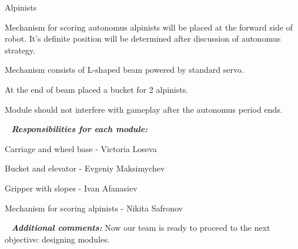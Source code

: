 \begin{enumerate*}
  	\item Alpinists
  	\begin{enumerate*}
  		\item Mechanism for scoring autonomus alpinists will be placed at the forward side of robot. It's definite position will be determined after discussion of autonomus strategy.
  		
  		\item Mechanism consists of L-shaped beam powered by standard servo.
  		
  		\item At the end of beam placed a bucket for 2 alpinists.
  		
  		\item Module should not interfere with gameplay after the autonomus period ends.
  	\end{enumerate*}
  	
  \end{enumerate*}
  
   \newline
  \textit{\textbf{Responsibilities for each module:}}
  \begin{enumerate*}
  	\item Carriage and wheel base - Victoria Loseva
  	
  	\item Bucket and elevator - Evgeniy Maksimychev
  	
  	\item Gripper with slopes - Ivan Afanasiev
  	
  	\item Mechanism for scoring alpinists - Nikita Safronov
  \end{enumerate*}
  
   \newline
  \textit{\textbf{Additional comments:}} Now our team is ready to proceed to the next objective: designing modules.

\fillpage
